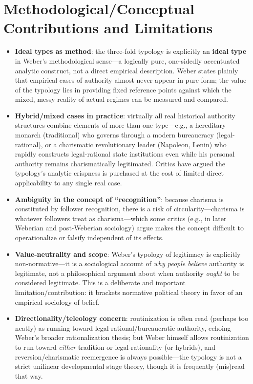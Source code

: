 \documentclass[12pt]{article}
\begin{document}
\section{Methodological/Conceptual Contributions and Limitations}

\begin{itemize}[leftmargin=*, itemsep=4pt]
    \item \textbf{Ideal types as method}: the three-fold typology is explicitly an \textbf{ideal type} in Weber's methodological sense---a logically pure, one-sidedly accentuated analytic construct, not a direct empirical description. Weber states plainly that empirical cases of authority almost never appear in pure form; the value of the typology lies in providing fixed reference points against which the mixed, messy reality of actual regimes can be measured and compared.
    \item \textbf{Hybrid/mixed cases in practice}: virtually all real historical authority structures combine elements of more than one type---e.g., a hereditary monarch (traditional) who governs through a modern bureaucracy (legal-rational), or a charismatic revolutionary leader (Napoleon, Lenin) who rapidly constructs legal-rational state institutions even while his personal authority remains charismatically legitimated. Critics have argued the typology's analytic crispness is purchased at the cost of limited direct applicability to any single real case.
    \item \textbf{Ambiguity in the concept of ``recognition''}: because charisma is constituted by follower recognition, there is a risk of circularity---charisma is whatever followers treat as charisma---which some critics (e.g., in later Weberian and post-Weberian sociology) argue makes the concept difficult to operationalize or falsify independent of its effects.
    \item \textbf{Value-neutrality and scope}: Weber's typology of legitimacy is explicitly non-normative---it is a sociological account of \emph{why people believe} authority is legitimate, not a philosophical argument about when authority \emph{ought} to be considered legitimate. This is a deliberate and important limitation/contribution: it brackets normative political theory in favor of an empirical sociology of belief.
    \item \textbf{Directionality/teleology concern}: routinization is often read (perhaps too neatly) as running toward legal-rational/bureaucratic authority, echoing Weber's broader rationalization thesis; but Weber himself allows routinization to run toward \emph{either} tradition or legal-rationality (or hybrids), and reversion/charismatic reemergence is always possible---the typology is not a strict unilinear developmental stage theory, though it is frequently (mis)read that way.

\end{itemize}
\end{document}
